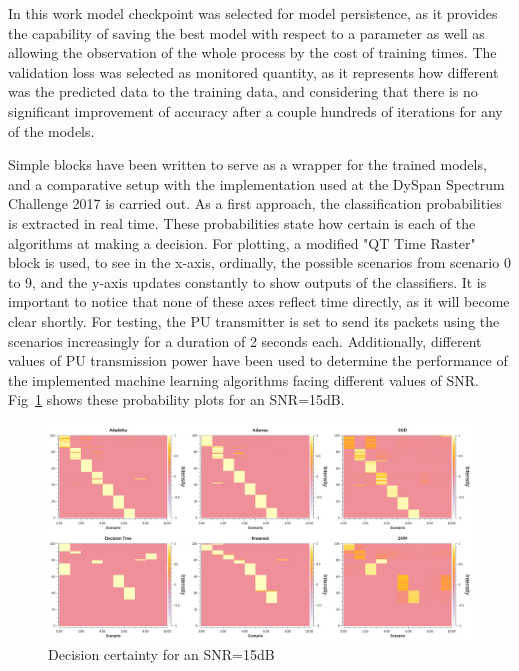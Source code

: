 In this work model checkpoint was selected for model persistence, as it provides the capability of saving the best model with respect to a parameter as well as allowing the observation of the whole process by the cost of training times. The validation loss was selected as monitored quantity, as it represents how different was the predicted data to the training data, and considering that there is no significant improvement of accuracy after a couple hundreds of iterations for any of the models.

Simple blocks have been written to serve as a wrapper for the trained models, and a comparative setup with the implementation used at the DySpan Spectrum Challenge 2017 is carried out. As a first approach, the classification probabilities is extracted in real time. These probabilities state how certain is each of the algorithms at making a decision. For plotting, a modified "QT Time Raster" block is used, to see in the x-axis, ordinally, the possible scenarios from scenario 0 to 9, and the y-axis updates constantly to show outputs of the classifiers. It is important to notice that none of these axes reflect time directly, as it will become clear shortly. For testing, the \ac{PU} transmitter is set to send its packets using the scenarios increasingly for a duration of 2 seconds each. Additionally, different values of \ac{PU} transmission power have been used to determine the performance of the implemented machine learning algorithms facing different values of SNR. Fig~\ref{fig:prob_snr_15} shows these probability plots for an SNR=15dB.

\begin{figure}[!htb]
    \centering
      \includegraphics[width=\textwidth]{figures/prob_snr_15}
      \caption{Decision certainty for an SNR=15dB}
      \label{fig:prob_snr_15}
\end{figure}

